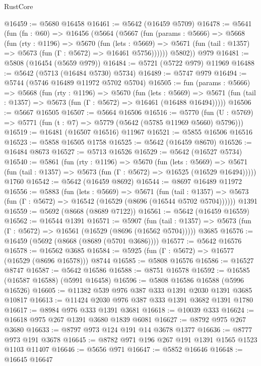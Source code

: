 \begin{lexlean}{RustCore}
\begin{coremodule}
@16459 := @5680 @16458
@16461 := @5642 (@16459 @5709)
@16478 := @5641
    (fun (fn : @60) =>
    @16456
      (@5664
        (@5667
          (fun (params : @5666) =>
          @5668
            (fun (rty : @1196) =>
            @5670
              (fun (lets : @5669) =>
              @5671 (fun (tail : @1357) => @5673 (fun (Γ : @5672) => @16461 @5756))))))
        @5802))
    @979
@16481 := @5808 (@16454 (@5659 @979))
@16484 := @5721 (@5722 @979) @11969
@16488 := @5642 (@5713 (@16484 @5730) @5734)
@16489 := @5747 @979
@16494 := @5744 (@5746 @16489 @11972 @5702 @5704)
@16505 := fun (params : @5666) =>
  @5668
    (fun (rty : @1196) =>
    @5670
      (fun (lets : @5669) =>
      @5671 (fun (tail : @1357) => @5673 (fun (Γ : @5672) => @16461 (@16488 @16494)))))
@16506 := @5667 @16505
@16507 := @5664 @16506
@16516 := @5770
    (fun (U : @5769) => @5771 (fun (t : @7) => @5779 (@5642 (@5785 @11969 @5660) @5796)))
@16519 := @16481 (@16507 @16516) @11967
@16521 := @5855 @16506 @16516
@16523 := @5858 @16505 @1758
@16525 := @5642 (@16459 @8670)
@16526 := @16484 @8673
@16527 := @5713 @16526
@16529 := @5642 (@16527 @5734)
@16540 := @5861
    (fun (rty : @1196) =>
    @5670
      (fun (lets : @5669) =>
      @5671 (fun (tail : @1357) => @5673 (fun (Γ : @5672) => @16525 (@16529 @16494)))))
    @1760
@16542 := @5642 (@16459 @8692)
@16544 := @8697 @16489 @11972
@16556 := @5883
    (fun (lets : @5669) =>
    @5671
      (fun (tail : @1357) =>
      @5673 (fun (Γ : @5672) => @16542 (@16529 (@8696 (@16544 @5702 @5704))))))
    @1391
@16559 := @5692 (@8668 (@8689 @7122))
@16561 := @5642 (@16459 @16559)
@16562 := @16544 @1391
@16571 := @5907
    (fun (tail : @1357) => @5673 (fun (Γ : @5672) => @16561 (@16529 (@8696 (@16562 @5704)))))
    @3685
@16576 := @16459 (@5692 (@8668 (@8689 (@5701 @3686))))
@16577 := @5642 @16576
@16578 := @16562 @3685
@16584 := @5925 (fun (Γ : @5672) => @16577 (@16529 (@8696 @16578))) @8744
@16585 := @5808 @16576
@16586 := @16527 @8747
@16587 := @5642 @16586
@16588 := @8751 @16578
@16592 := @16585 (@16587 @16588) (@5991 @16458)
@16596 := @5808 @16586 @16588 (@5996 @16526)
@16605 := @11382 @539 @976 @387 @333 @1391 @2030 @1391 @3685 @10817
@16613 := @11424 @2030 @976 @387 @333 @1391 @3682 @1391 @1780
@16617 := @8984 @976 @333 @1391 @3681
@16618 := @10039 @333
@16624 := @16618 @975 @267 @1391 @3680 @1839 @6081
@16627 := @8792 @975 @267 @3680
@16633 := @8797 @973 @124 @191 @14 @3678 @1377
@16636 := @8777 @973 @191 @3678
@16645 := @8782 @971 @196 @267 @191 @1391 @1565 @1523 @1103 @11407
@16646 := @5656 @971
@16647 := @5852 @16646
@16648 := @16645 @16647

\end{coremodule}
\end{lexlean}
